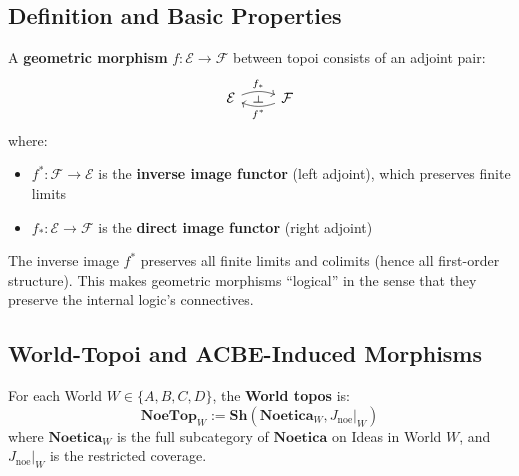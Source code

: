 \subsection{Definition and Basic Properties}
\label{subsec:geometric-morphisms-def}

\begin{definition}
\label{def:geometric-morphism}
A \textbf{geometric morphism} $f : \mathcal{E} \to \mathcal{F}$ between topoi
consists of an adjoint pair:
\[
\begin{tikzcd}
  \mathcal{E}
    \arrow[r, bend left=20, "f_*"{name=U}]
  &
  \mathcal{F}
    \arrow[l, bend left=20, "f^*"{name=D}]
  \arrow[phantom, from=D, to=U, "\dashv" rotate=-90]
\end{tikzcd}
\]
where:
\begin{itemize}
  \item $f^* : \mathcal{F} \to \mathcal{E}$ is the \textbf{inverse image functor}
        (left adjoint), which preserves finite limits
  \item $f_* : \mathcal{E} \to \mathcal{F}$ is the \textbf{direct image functor}
        (right adjoint)
\end{itemize}
\end{definition}

\begin{remark}
\label{rem:geometric-vs-logical}
The inverse image $f^*$ preserves all finite limits and colimits (hence all
first-order structure). This makes geometric morphisms ``logical'' in the
sense that they preserve the internal logic's connectives.
\end{remark}

\subsection{World-Topoi and ACBE-Induced Morphisms}
\label{subsec:world-topoi}

\begin{definition}
\label{def:world-topos}
For each World $W \in \{A, B, C, D\}$, the \textbf{World topos} is:
\[
  \mathbf{NoeTop}_W := \mathbf{Sh}(\mathbf{Noetica}_W, J_{\mathrm{noe}}|_W)
\]
where $\mathbf{Noetica}_W$ is the full subcategory of $\mathbf{Noetica}$ on
Ideas in World $W$, and $J_{\mathrm{noe}}|_W$ is the restricted coverage.
\end{definition}

